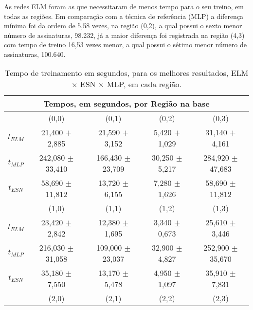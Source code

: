 As redes ELM foram as que necessitaram de menos tempo para o seu treino, em todas as regiões. Em comparação com a técnica de referência (MLP) a diferença mínima foi da ordem de 5,58 vezes, na região (0,2), a qual possui o sexto menor número de assinaturas, 98.232, já a maior diferença foi registrada na região (4,3) com tempo de treino 16,53 vezes menor, a qual possui o sétimo menor número de assinaturas, 100.640.

\begin{table}[H]
	\centering
	\caption{Tempo de treinamento em segundos, para os melhores resultados, ELM $\times$  ESN $\times$ MLP, em cada região.}
	\label{tab:t_ELMxESNxBP_2015}
	\begin{small}
		\setlength{\extrarowheight}{0pt}       %
		\begin{tabular}{*{5}{c}} \toprule
			\multicolumn{5}{c}{Tempos, em segundos, por Região na base}  \\ \midrule
		      &          (0,0)       &        (0,1)         &        (0,2)        &      (0,3)          \\ \cmidrule(lr){2-2}\cmidrule(lr){3-3}\cmidrule(lr){4-4}\cmidrule(lr){5-5}
	$t_{ELM}$ &  21,400 $\pm$  2,885 &  21,590 $\pm$  3,152 &  5,420 $\pm$ 1,029 &  31,140 $\pm$  4,161 \\
	$t_{MLP}$ & 242,080 $\pm$ 33,410 & 166,430 $\pm$ 23,709 & 30,250 $\pm$ 5,217 & \cellcolor{gray!15}284,920 $\pm$ 47,683 \\
	$t_{ESN}$ &  58,690 $\pm$ 11,812 &  13,720 $\pm$  6,155 &  7,280 $\pm$ 1,626 &  58,690 $\pm$ 11,812 \\ \midrule \midrule
		      &          (1,0)       &        (1,1)         &        (1,2)        &      (1,3)          \\ \cmidrule(lr){2-2}\cmidrule(lr){3-3}\cmidrule(lr){4-4}\cmidrule(lr){5-5}	
	$t_{ELM}$ &  23,420 $\pm$  2,842 &  12,380 $\pm$  1,695 &  3,340 $\pm$ 0,673 &  25,610 $\pm$  3,446 \\
	$t_{MLP}$ & 216,030 $\pm$ 31,058 & 109,000 $\pm$ 23,037 & 32,900 $\pm$ 4,827 & 252,900 $\pm$ 35,670 \\
	$t_{ESN}$ &  35,180 $\pm$  7,550 &  13,170 $\pm$  5,478 &  4,950 $\pm$ 1,097 &  35,910 $\pm$  7,831 \\ \midrule \midrule
		      &          (2,0)       &        (2,1)         &        (2,2)        &      (2,3)          \\ \cmidrule(lr){2-2}\cmidrule(lr){3-3}\cmidrule(lr){4-4}\cmidrule(lr){5-5}	

\end{tabular}
\end{small}
\end{table}
